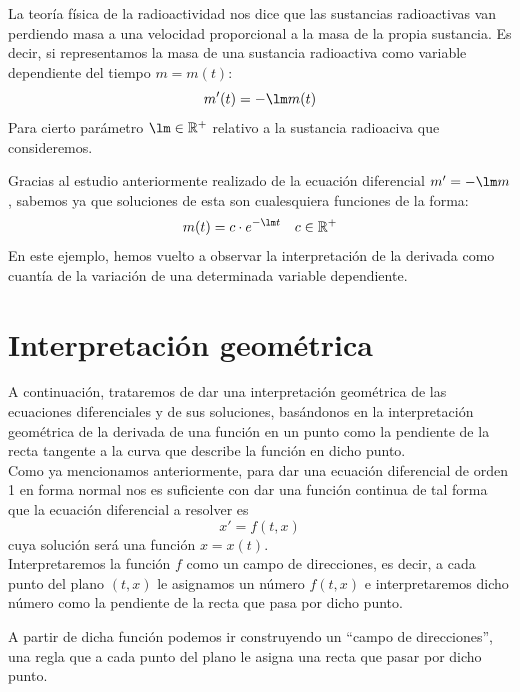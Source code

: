 \begin{ejemplo}
    La teoría física de la radioactividad nos dice que las sustancias radioactivas van perdiendo masa a una velocidad proporcional a la masa de la propia sustancia. Es decir, si representamos la masa de una sustancia radioactiva como variable dependiente del tiempo $m=m(t)$:
    \begin{equation*}
        m'(t) = -\lm m(t)
    \end{equation*}
    Para cierto parámetro $\lm \in \mathbb{R}^+$ relativo a la sustancia radioaciva que consideremos.

    Gracias al estudio anteriormente realizado de la ecuación diferencial $m' = -\lm m$, sabemos ya que soluciones de esta son cualesquiera funciones de la forma:
    \begin{equation*}
        m(t) = c\cdot e^{-\lm t}\quad c\in \mathbb{R}^+
    \end{equation*}
En este ejemplo, hemos vuelto a observar la interpretación de la derivada como cuantía de la variación de una determinada variable dependiente.
\end{ejemplo}

\section{Interpretación geométrica}
A continuación, trataremos de dar una interpretación geométrica de las ecuaciones diferenciales y de sus soluciones, basándonos en la interpretación geométrica de la derivada de una función en un punto como la pendiente de la recta tangente a la curva que describe la función en dicho punto.\\

Como ya mencionamos anteriormente, para dar una ecuación diferencial de orden 1 en forma normal nos es suficiente con dar una función
continua de tal forma que la ecuación diferencial a resolver es
\begin{equation*}
    x' = f(t,x)
\end{equation*}
cuya solución será una función $x = x(t)$.\\

Interpretaremos la función $f$ como un campo de direcciones, es decir, a cada punto del plano $(t,x)$ le asignamos un número $f(t,x)$ e interpretaremos dicho número como la pendiente de la recta que pasa por dicho punto.

A partir de dicha función podemos ir construyendo un ``campo de direcciones'', una regla que a cada punto del plano le asigna una recta que pasar por dicho punto.\\

